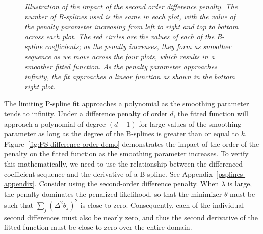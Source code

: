 \begin{figure}[H]
\begin{subfigure}{.5\textwidth}
  \label{fig:pspline_small_lambda}
\end{subfigure}
\caption{\textit{Illustration of the impact of the second order difference penalty. The number of B-splines used is the same in each plot, with the value of the penalty parameter increasing from left to right and top to bottom across each plot. The red circles are the values of each of the B-spline coefficients; as the penalty increases, they form as smoother sequence as we move across the four plots, which results in a smoother fitted function. As the penalty parameter approaches infinity, the fit approaches a linear function as shown in the bottom right plot.}}
\label{fig:increasing-lambda-pspline-fits}
\end{figure}
The limiting P-spline fit approaches a polynomial as the smoothing parameter tends to infinity. Under a difference penalty of order $d$, the fitted function will approach a polynomial of degree $\left(d-1\right)$ for large values of the smoothing parameter as long as the degree of the B-splines is greater than or equal to $k$. Figure~\ref{fig:PS-difference-order-demo} demonstrates the impact of the order of the penalty on the fitted function as the smoothing parameter increases. To verify this mathematically, we need to use the relationship between the differenced coefficient sequence and the derivative of a B-spline. See Appendix~\ref{psplines-appendix}. Consider using the second-order difference penalty. When $\lambda$ is large, the penalty dominates the penalized likelihood, so that the minimizer $\theta$ must be such that $\sum\limits_{j}\left(\Delta^2\theta_j\right)^2$ is close to zero. Consequently, each of the individual second differences must also be nearly zero, and thus the second derivative of the fitted function must be close to zero over the entire domain.
